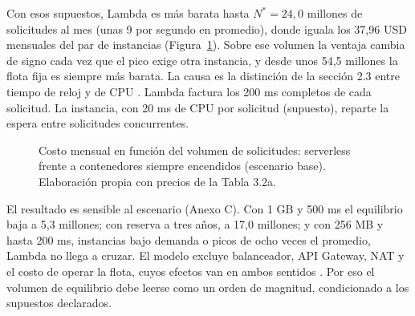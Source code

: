 \documentclass[12pt, letterpaper, table, xcdraw]{inf-pucv}
\begin{document}
Con esos supuestos, Lambda es más barata hasta $N^{*} = 24{,}0$ millones de solicitudes al mes (unas 9 por segundo en promedio), donde iguala los 37,96 USD mensuales del par de instancias (Figura~\ref{fig:equilibrio}). Sobre ese volumen la ventaja cambia de signo cada vez que el pico exige otra instancia, y desde unos 54,5 millones la flota fija es siempre más barata. La causa es la distinción de la sección 2.3 entre tiempo de reloj y de CPU \cite{lin_demystifying_2026}. Lambda factura los 200 ms completos de cada solicitud. La instancia, con 20 ms de CPU por solicitud (supuesto), reparte la espera entre solicitudes concurrentes.

\begin{figure}[htbp]
\centering
{}
\caption{Costo mensual en función del volumen de solicitudes: serverless frente a contenedores siempre encendidos (escenario base). Elaboración propia con precios de la Tabla 3.2a.}
\label{fig:equilibrio}
\end{figure}

El resultado es sensible al escenario (Anexo C). Con 1 GB y 500 ms el equilibrio baja a 5,3 millones; con reserva a tres años, a 17,0 millones; y con 256 MB y hasta 200 ms, instancias bajo demanda o picos de ocho veces el promedio, Lambda no llega a cruzar. El modelo excluye balanceador, API Gateway, NAT y el costo de operar la flota, cuyos efectos van en ambos sentidos \cite{hamza2024costdynamics}. Por eso el volumen de equilibrio debe leerse como un orden de magnitud, condicionado a los supuestos declarados.
\end{document}
